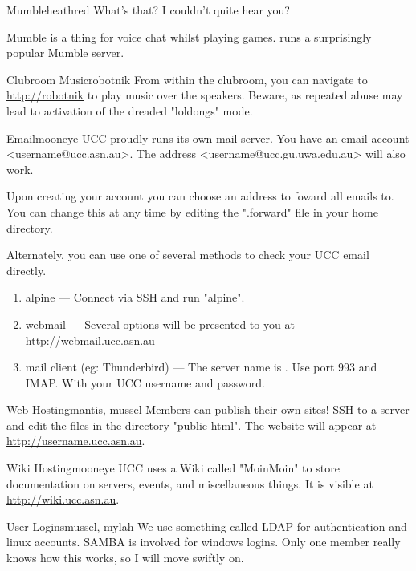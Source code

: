 \begin{uccservice}{Mumble}{heathred}
What's that? I couldn't quite hear you?

Mumble is a thing for voice chat whilst playing games.  runs a surprisingly popular Mumble server.
\end{uccservice}

\begin{uccservice}{Clubroom Music}{robotnik}
From within the clubroom, you can navigate to \url{http://robotnik} to play music over the speakers. Beware, as repeated abuse may lead to activation of the dreaded "loldongs" mode.
\end{uccservice}

\begin{uccservice}{Email}{mooneye}
UCC proudly runs its own mail server. You have an email account <username@ucc.asn.au>. The address <username@ucc.gu.uwa.edu.au> will also work.

Upon creating your account you can choose an address to foward all emails to. You can change this at any time by editing the ".forward" file in your home directory.

Alternately, you can use one of several methods to check your UCC email directly.
\begin{enumerate}
	\item alpine --- Connect via SSH and run "alpine".
	\item webmail --- Several options will be presented to you at \url{http://webmail.ucc.asn.au}
	\item mail client (eg: Thunderbird) --- The server name is . Use port 993 and IMAP. With your UCC username and password.
\end{enumerate}
\end{uccservice}

\begin{uccservice}{Web Hosting}{mantis, mussel}
Members can publish their own sites! SSH to a server and edit the files in the directory "public-html". The website will appear at \url{http://username.ucc.asn.au}.
\end{uccservice}

\begin{uccservice}{Wiki Hosting}{mooneye}
UCC uses a Wiki called "MoinMoin" to store documentation on servers, events, and miscellaneous things. It is visible at \url{http://wiki.ucc.asn.au}.
\end{uccservice}

\begin{uccservice}{User Logins}{mussel, mylah}
We use something called LDAP for authentication and linux accounts. SAMBA is involved for windows logins. Only one member really knows how this works, so I will move swiftly on.
\end{uccservice}

